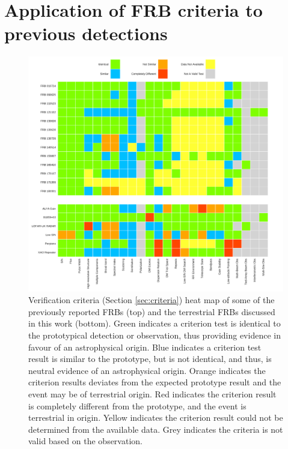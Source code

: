 \documentclass[a4paper,fleqn,usenatbib]{mnras}
\begin{document}
\section{Application of FRB criteria to previous detections}

\begin{figure}
    \includegraphics[width=1.0\linewidth]{verification/FRBheatmap.pdf}
    \caption{Verification criteria (Section \ref{sec:criteria}) heat map of some
    of the previously reported FRBs (top) and the terrestrial FRBs discussed in
    this work (bottom).  Green indicates a criterion test is identical to the
    prototypical detection or observation, thus providing evidence in favour of
    an astrophysical origin.  Blue indicates a criterion test result is similar
    to the prototype, but is not identical, and thus, is neutral evidence of an
    astrophysical origin.  Orange indicates the criterion results deviates from
    the expected prototype result and the event may be of terrestrial origin.
    Red indicates the criterion result is completely different from the
    prototype, and the event is terrestrial in origin. Yellow indicates the
    criterion result could not be determined from the available data.  Grey
    indicates the criteria is not valid based on the observation.
    }
    \label{fig:heat_map}
\end{figure}
\end{document}
